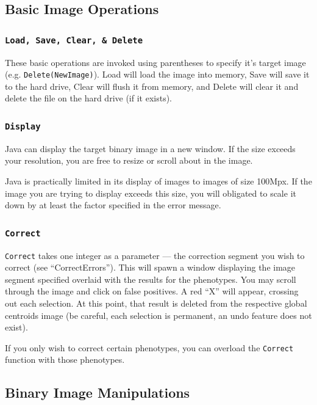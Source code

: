 \documentclass[12pt]{article}
\begin{document}
\subsection{Basic Image Operations}

\subsubsection{\tt Load, Save, Clear, \& Delete}

These basic operations are invoked using parentheses to specify it's target image (e.g. {\tt Delete(NewImage)}). Load will load the image into memory, Save will save it to the hard drive, Clear will flush it from memory, and Delete will clear it and delete the file on the hard drive (if it exists).

\subsubsection{\tt Display}

Java can display the target binary image in a new window. If the size exceeds your resolution, you are free to resize or scroll about in the image.

Java is practically limited in its display of images to images of size 100Mpx. If the image you are trying to display exceeds this size, you will obligated to scale it down by at least the factor specified in the error message.

\subsubsection{\tt Correct}

{\tt Correct} takes one integer as a parameter --- the correction segment you wish to correct (see ``CorrectErrors''). This will spawn a window displaying the image segment specified overlaid with the results for the phenotypes. You may scroll through the image and click on false positives. A red ``X'' will appear, crossing out each selection. At this point, that result is deleted from the respective global centroids image (be careful, each selection is permanent, an undo feature does not exist).

If you only wish to correct certain phenotypes, you can overload the {\tt Correct} function with those phenotypes.

\subsection{Binary Image Manipulations}
\end{document}

